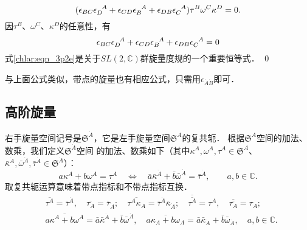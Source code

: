\begin{equation}
    (\epsilon_{BC} \epsilon_{D}^{\hphantom{A}A} + 
    \epsilon_{CD} \epsilon_{B}^{\hphantom{A}A}+
    \epsilon_{DB} \epsilon_{C}^{\hphantom{A}A}   )
    \tau^B \omega^C \kappa^D =0 .
\end{equation}
因$\tau^B$、$ \omega^C $、$\kappa^D$的任意性，有
\begin{equation}\label{chlar:eqn_3p2e}
    \epsilon_{BC} \epsilon_{D}^{\hphantom{A}A} + 
    \epsilon_{CD} \epsilon_{B}^{\hphantom{A}A}+
    \epsilon_{DB} \epsilon_{C}^{\hphantom{A}A}   =0 
\end{equation}
式\eqref{chlar:eqn_3p2e}是关于$SL(2,\mathbb{C})$群旋量度规的一个重要恒等式． \qed


与上面公式类似，带点的旋量也有相应公式，只需用$\epsilon_{\dot{A}\dot{B}}$即可．

\subsection{高阶旋量}\label{chlar:sec_hs}


右手旋量空间记号是$\mathfrak{S}^{\dot{A}}$，它是左手旋量空间$\mathfrak{S}^{A}$的复共轭．
根据$\mathfrak{S}^{A}$空间的加法、数乘，我们定义$\mathfrak{S}^{\dot{A}}$空间
的加法、数乘如下（其中$\kappa^A ,\omega^A , \tau^A \in \mathfrak{S}^{A}$、
$\bar{\kappa}^{\dot{A}} , \bar{\omega}^{\dot{A}} , \bar{\tau}^{\dot{A}} \in \mathfrak{S}^{\dot{A}} $）：
\begin{equation}\label{chlar:eqn_akobc}
    a \kappa^A + b \omega^A = \tau^A \quad \Leftrightarrow \quad
    \bar{a} \bar{\kappa}^{\dot{A}} + \bar{b}\bar{\omega}^{\dot{A}} = \bar{\tau}^{\dot{A}},
    \qquad a,b \in \mathbb{C}. 
\end{equation}
取复共轭运算意味着带点指标和不带点指标互换．
\begin{equation}\label{chlar:eqn_cjt}
\begin{aligned}
    &\overline{\tau^A}= \bar{\tau}^{\dot{A}},\quad \overline{\tau_A}= \bar{\tau}_{\dot{A}};\quad
    \overline{\tau^A \kappa_A}= \bar{\tau}^{\dot{A}} \bar{\kappa}_{\dot{A}};\quad
    \overline{\overline{\tau^A}} = \tau^A, \quad \overline{\overline{\tau_A}} = \tau_A; \\ 
    &\overline{a \kappa^A + b \omega^A} = \bar{a} \bar{\kappa}^{\dot{A}} + \bar{b}\bar{\omega}^{\dot{A}}, \quad
    \overline{a \kappa_A + b \omega_A} = \bar{a} \bar{\kappa}_{\dot{A}} + \bar{b}\bar{\omega}_{\dot{A}},
    \quad a,b \in \mathbb{C}.
\end{aligned}
\end{equation}

